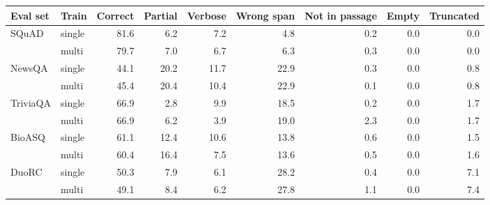 \begin{tabular}{llrrrrrrr}
\toprule
Eval set & Train & Correct & Partial & Verbose & Wrong span & Not in passage & Empty & Truncated \\
\midrule
SQuAD & single & 81.6 & 6.2 & 7.2 & 4.8 & 0.2 & 0.0 & 0.0 \\
 & multi & 79.7 & 7.0 & 6.7 & 6.3 & 0.3 & 0.0 & 0.0 \\
NewsQA & single & 44.1 & 20.2 & 11.7 & 22.9 & 0.3 & 0.0 & 0.8 \\
 & multi & 45.4 & 20.4 & 10.4 & 22.9 & 0.1 & 0.0 & 0.8 \\
TriviaQA & single & 66.9 & 2.8 & 9.9 & 18.5 & 0.2 & 0.0 & 1.7 \\
 & multi & 66.9 & 6.2 & 3.9 & 19.0 & 2.3 & 0.0 & 1.7 \\
BioASQ & single & 61.1 & 12.4 & 10.6 & 13.8 & 0.6 & 0.0 & 1.5 \\
 & multi & 60.4 & 16.4 & 7.5 & 13.6 & 0.5 & 0.0 & 1.6 \\
DuoRC & single & 50.3 & 7.9 & 6.1 & 28.2 & 0.4 & 0.0 & 7.1 \\
 & multi & 49.1 & 8.4 & 6.2 & 27.8 & 1.1 & 0.0 & 7.4 \\
\bottomrule
\end{tabular}